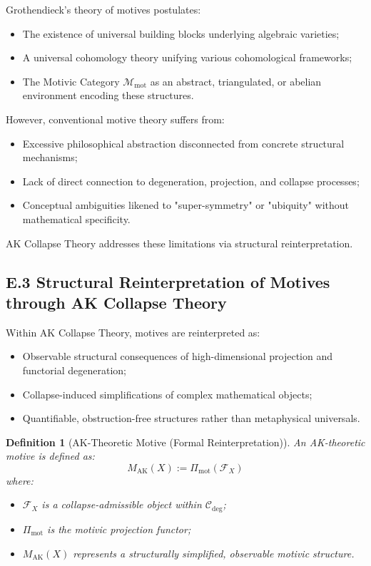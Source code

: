 \documentclass[11pt]{article}
\newtheorem{definition}[theorem]{Definition}
\begin{document}
Grothendieck's theory of motives postulates:

\begin{itemize}
    \item The existence of universal building blocks underlying algebraic varieties;
    \item A universal cohomology theory unifying various cohomological frameworks;
    \item The Motivic Category $\mathcal{M}_{\mathrm{mot}}$ as an abstract, triangulated, or abelian environment encoding these structures.
\end{itemize}

However, conventional motive theory suffers from:

\begin{itemize}
    \item Excessive philosophical abstraction disconnected from concrete structural mechanisms;
    \item Lack of direct connection to degeneration, projection, and collapse processes;
    \item Conceptual ambiguities likened to "super-symmetry" or "ubiquity" without mathematical specificity.
\end{itemize}

AK Collapse Theory addresses these limitations via structural reinterpretation.

\subsection*{E.3 Structural Reinterpretation of Motives through AK Collapse Theory}

Within AK Collapse Theory, motives are reinterpreted as:

\begin{itemize}
    \item Observable structural consequences of high-dimensional projection and functorial degeneration;
    \item Collapse-induced simplifications of complex mathematical objects;
    \item Quantifiable, obstruction-free structures rather than metaphysical universals.
\end{itemize}

\begin{definition}[AK-Theoretic Motive (Formal Reinterpretation)]
An \emph{AK-theoretic motive} is defined as:
\[
M_{\mathrm{AK}}(X) := \Pi_{\mathrm{mot}}(\mathcal{F}_X)
\]
where:

\begin{itemize}
    \item $\mathcal{F}_X$ is a collapse-admissible object within $\mathcal{C}_{\mathrm{deg}}$;
    \item $\Pi_{\mathrm{mot}}$ is the motivic projection functor;
    \item $M_{\mathrm{AK}}(X)$ represents a structurally simplified, observable motivic structure.
\end{itemize}
\end{definition}
\end{document}
